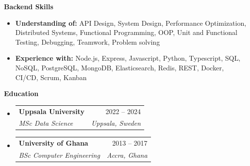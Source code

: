 \documentclass[a4paper,12pt]{article}[leftmargin=*]
\makeatletter
\def \entryspacing {-0pt}
\renewcommand{\section}[2]{\vspace{5pt}
  \colorbox{secondary}{\color{white}\raggedbottom\normalsize\textbf{{#1}{\hspace{7pt}#2}}}
}
\newcommand{\resumeEntryStart}{\begin{itemize}[leftmargin=2.5mm]}
\newcommand{\resumeEntryEnd}{\end{itemize}\vspace{\entryspacing}}
\newcommand{\resumeEntryTSDL}[4]{
  \vspace{-1pt}\item[]
    \begin{tabularx}{0.99\textwidth}{X@{\hspace{60pt}}r}
      \textbf{\color{primary}#1} & {\firabook\color{accent}\small#2} \\
      \textit{\color{accent}\small#3} & \textit{\color{accent}\small#4} \\
    \end{tabularx}\vspace{-7pt}
}
\newcommand{\resumeEntryS}[2]{
  \item[]\small{
    \textbf{\color{primary}#1 }{ #2 \vspace{-6pt}}
  }
}
\makeatother
\begin{document}
\section{\faGears} {Backend Skills}
 \resumeEntryStart
  \resumeEntryS
    {Understanding of:}
    {API Design, System Design, Performance Optimization, Distributed Systems, Functional Programming, OOP, Unit and Functional Testing, Debugging, Teamwork, Problem solving}

  \resumeEntryS
    {Experience with:}
    {\color{black} Node.js, Express, Javascript, Python, Typescript, SQL, NoSQL, PostgreSQL, MongoDB, Elasticsearch, Redis, REST,  Docker, CI/CD, Scrum, Kanban}
 \resumeEntryEnd




\vspace{2pt}
\section{\faGraduationCap}{Education}
  \resumeEntryStart
    \vspace{-10pt}
    \resumeEntryTSDL
      {Uppsala University}{2022 -- 2024}
      {MSc Data Science}
      {Uppsala, Sweden}
  \resumeEntryEnd
  \resumeEntryStart
    \vspace{-10pt}
    \resumeEntryTSDL
      {University of Ghana}{2013 -- 2017}
      {BSc Computer Engineering}
      {Accra, Ghana}
  \resumeEntryEnd
\end{document}

